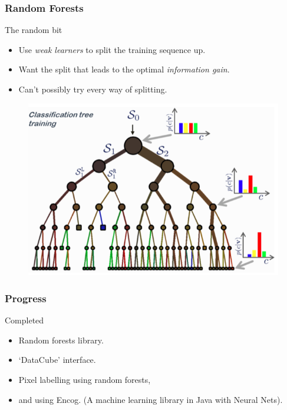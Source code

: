 \documentclass{beamer}
\begin{document}
\begin{frame}
    \frametitle{Random Forests}

    \begin{block}{The random bit}
        \begin{itemize}
            \item Use \textit{weak learners} to split the training sequence up.
            \item Want the split that leads to the optimal \textit{information gain}.
            \item Can't possibly try every way of splitting.
        \end{itemize}

        \begin{figure}[H]
            \centering
            \includegraphics[scale=0.3]{ProbabilityTree.png}
            \caption{}
        \end{figure}
    \end{block}
\end{frame}

\begin{frame}
    \frametitle{Progress}

    \begin{block}{Completed}
        \begin{itemize}
            \item Random forests library.
            \item `DataCube' interface.
            \item Pixel labelling using random forests,
            \item and using Encog. (A machine learning library in Java with Neural Nets).
        \end{itemize}
    \end{block}
\end{frame}
\end{document}
